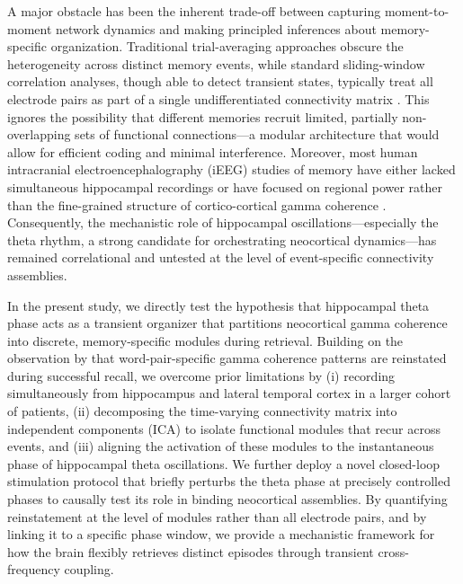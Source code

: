 \documentclass{article}
\begin{document}
A major obstacle has been the inherent trade-off between capturing moment-to-moment network dynamics and making principled inferences about memory-specific organization. Traditional trial-averaging approaches obscure the heterogeneity across distinct memory events, while standard sliding-window correlation analyses, though able to detect transient states, typically treat all electrode pairs as part of a single undifferentiated connectivity matrix \cite{keller2023eventspecific}. This ignores the possibility that different memories recruit limited, partially non-overlapping sets of functional connections—a modular architecture that would allow for efficient coding and minimal interference. Moreover, most human intracranial electroencephalography (iEEG) studies of memory have either lacked simultaneous hippocampal recordings or have focused on regional power rather than the fine-grained structure of cortico-cortical gamma coherence \cite{axelrod2015theta}. Consequently, the mechanistic role of hippocampal oscillations—especially the theta rhythm, a strong candidate for orchestrating neocortical dynamics—has remained correlational and untested at the level of event-specific connectivity assemblies.

In the present study, we directly test the hypothesis that hippocampal theta phase acts as a transient organizer that partitions neocortical gamma coherence into discrete, memory-specific modules during retrieval. Building on the observation by \citet{keller2023eventspecific} that word-pair-specific gamma coherence patterns are reinstated during successful recall, we overcome prior limitations by (i) recording simultaneously from hippocampus and lateral temporal cortex in a larger cohort of patients, (ii) decomposing the time-varying connectivity matrix into independent components (ICA) to isolate functional modules that recur across events, and (iii) aligning the activation of these modules to the instantaneous phase of hippocampal theta oscillations. We further deploy a novel closed-loop stimulation protocol that briefly perturbs the theta phase at precisely controlled phases to causally test its role in binding neocortical assemblies. By quantifying reinstatement at the level of modules rather than all electrode pairs, and by linking it to a specific phase window, we provide a mechanistic framework for how the brain flexibly retrieves distinct episodes through transient cross-frequency coupling.
\end{document}
